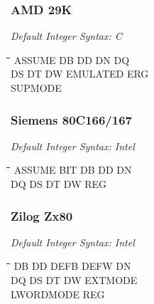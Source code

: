 \subsubsection{AMD 29K}

{\em Default Integer Syntax: C}

{\tt\begin{tabbing}
\hspace{3cm}\=\hspace{3cm}\=\hspace{3cm}\=\hspace{3cm}\=\kill
ASSUME     \> DB          \> DD          \> DN          \> DQ \\
DS         \> DT          \> DW          \> EMULATED    \> ERG \\
SUPMODE \\
\end{tabbing}}

\subsubsection{Siemens 80C166/167}

{\em Default Integer Syntax: Intel}

{\tt\begin{tabbing}
\hspace{3cm}\=\hspace{3cm}\=\hspace{3cm}\=\hspace{3cm}\=\kill
ASSUME     \> BIT         \> DB          \> DD          \> DN \\
DQ         \> DS          \> DT          \> DW          \> REG \\
\end{tabbing}}

\subsubsection{Zilog Zx80}

{\em Default Integer Syntax: Intel}

{\tt\begin{tabbing}
\hspace{3cm}\=\hspace{3cm}\=\hspace{3cm}\=\hspace{3cm}\=\kill
DB         \> DD          \> DEFB        \> DEFW        \> DN \\
DQ         \> DS          \> DT          \> DW          \> EXTMODE \\
LWORDMODE  \> REG \\
\end{tabbing}}

